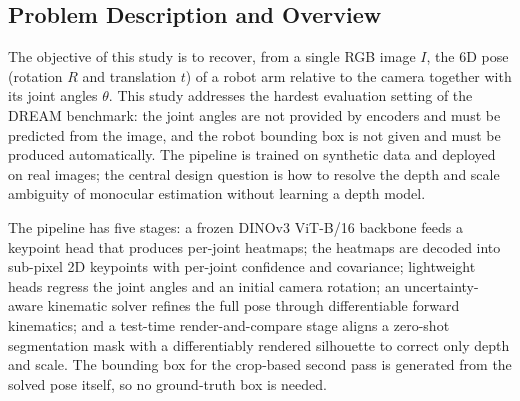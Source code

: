 \subsection{Problem Description and Overview}
\label{sec:problem}

The objective of this study is to recover, from a single RGB image $I$, the 6D pose (rotation $R$ and translation $t$) of a robot arm relative to the camera together with its joint angles $\theta$. This study addresses the hardest evaluation setting of the DREAM benchmark: the joint angles are not provided by encoders and must be predicted from the image, and the robot bounding box is not given and must be produced automatically. The pipeline is trained on synthetic data and deployed on real images; the central design question is how to resolve the depth and scale ambiguity of monocular estimation without learning a depth model.

The pipeline has five stages: a frozen DINOv3 ViT-B/16 backbone \cite{simeoni2025dinov3} feeds a keypoint head that produces per-joint heatmaps; the heatmaps are decoded into sub-pixel 2D keypoints with per-joint confidence and covariance; lightweight heads regress the joint angles and an initial camera rotation; an uncertainty-aware kinematic solver refines the full pose through differentiable forward kinematics; and a test-time render-and-compare stage aligns a zero-shot segmentation mask \cite{kirillov2023segment} with a differentiably rendered silhouette \cite{laine2020modular} to correct only depth and scale. The bounding box for the crop-based second pass is generated from the solved pose itself, so no ground-truth box is needed.

